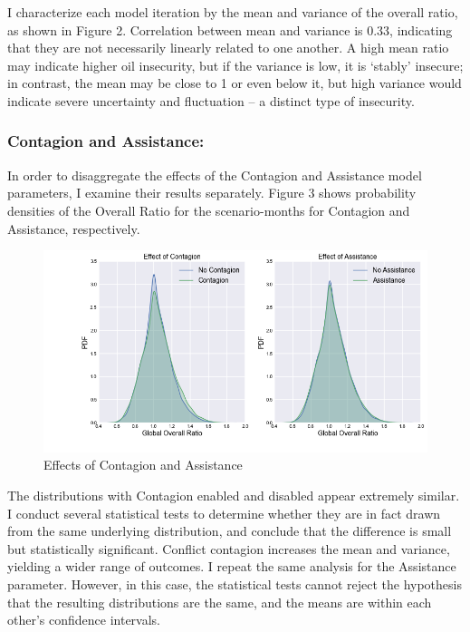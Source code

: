 \documentclass{llncs}
\begin{document}
I characterize each model iteration by the mean and variance of the overall ratio, as shown in Figure 2. Correlation between mean and variance is 0.33, indicating that they are not necessarily linearly related to one another. A high mean ratio may indicate higher oil insecurity, but if the variance is low, it is `stably' insecure; in contrast, the mean may be close to 1 or even below it, but high variance would indicate severe uncertainty and fluctuation -- a distinct type of insecurity. 

\subsubsection{Contagion and Assistance:}

In order to disaggregate the effects of the Contagion and Assistance model parameters, I examine their results separately. Figure 3 shows probability densities of the Overall Ratio for the scenario-months for Contagion and Assistance, respectively.

\begin{figure}[h!]
	\centering
	\includegraphics[width=\textwidth]{Figures/ContagionAndAssistance}
	\caption{Effects of Contagion and Assistance}
\end{figure}

The distributions with Contagion enabled and disabled appear extremely similar. I conduct several statistical tests to determine whether they are in fact drawn from the same underlying distribution, and conclude that the difference is small but statistically significant. Conflict contagion increases the mean and variance, yielding a wider range of outcomes. I repeat the same analysis for the Assistance parameter. However, in this case, the statistical tests cannot reject the hypothesis that the resulting distributions are the same, and the means are within each other's confidence intervals.
\end{document}
